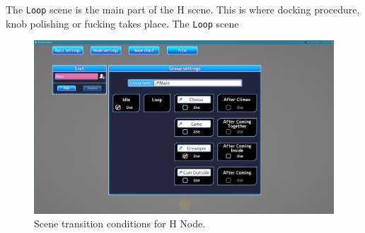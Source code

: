 \documentclass{report}
\begin{document}
The \texttt{Loop} scene is the main part of the H scene. This is where docking procedure, knob polishing or fucking takes place. The \texttt{Loop} scene 

\begin{figure}[!htpb]
    \centering
    \includegraphics[width=\textwidth]{Figures/hscenestartup.PNG}
    \caption{Scene transition conditions for H Node.}
    \label{fig:hscenestart}
\end{figure}

\subsection{}
\end{document}
